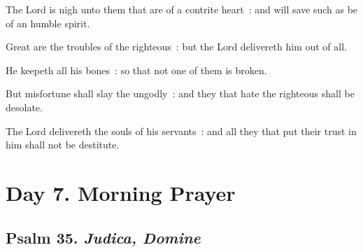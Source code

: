 The Lord is nigh unto them that are of a contrite heart~: and will save such as be of an humble spirit.\par
{}Great are the troubles of the righteous~: but the Lord delivereth him out of all.\par
{}He keepeth all his bones~: so that not one of them is broken.\par
{}But misfortune shall slay the ungodly~: and they that hate the righteous shall be desolate.\par
{}The Lord delivereth the souls of his servants~: and all they that put their trust in him shall not be destitute.\par


\section*{Day 7. Morning Prayer}

\subsection{Psalm 35. \textit{Judica, Domine}}


